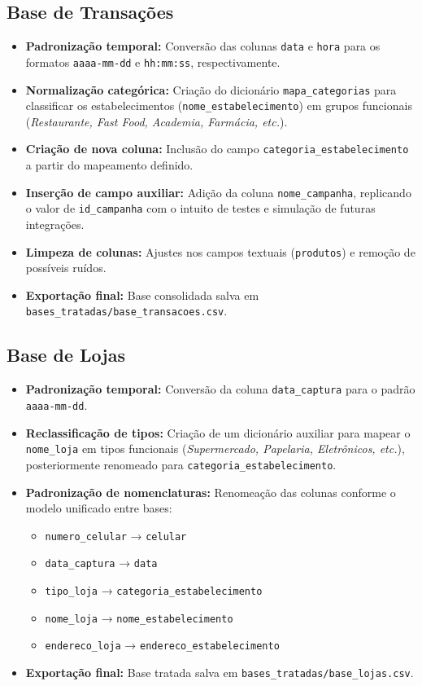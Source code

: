 \documentclass[12pt]{article}
\begin{document}
\subsection{Base de Transações}
\begin{itemize}
    \item \textbf{Padronização temporal:} Conversão das colunas \texttt{data} e \texttt{hora} para os formatos \texttt{aaaa-mm-dd} e \texttt{hh:mm:ss}, respectivamente.
    \item \textbf{Normalização categórica:} Criação do dicionário \texttt{mapa\_categorias} para classificar os estabelecimentos (\texttt{nome\_estabelecimento}) em grupos funcionais (\textit{Restaurante, Fast Food, Academia, Farmácia, etc.}).
    \item \textbf{Criação de nova coluna:} Inclusão do campo \texttt{categoria\_estabelecimento} a partir do mapeamento definido.
    \item \textbf{Inserção de campo auxiliar:} Adição da coluna \texttt{nome\_campanha}, replicando o valor de \texttt{id\_campanha} com o intuito de testes e simulação de futuras integrações.
    \item \textbf{Limpeza de colunas:} Ajustes nos campos textuais (\texttt{produtos}) e remoção de possíveis ruídos.
    \item \textbf{Exportação final:} Base consolidada salva em \texttt{bases\_tratadas/base\_transacoes.csv}.
\end{itemize}

\subsection{Base de Lojas}
\begin{itemize}
    \item \textbf{Padronização temporal:} Conversão da coluna \texttt{data\_captura} para o padrão \texttt{aaaa-mm-dd}.
    \item \textbf{Reclassificação de tipos:} Criação de um dicionário auxiliar para mapear o \texttt{nome\_loja} em tipos funcionais (\textit{Supermercado, Papelaria, Eletrônicos, etc.}), posteriormente renomeado para \texttt{categoria\_estabelecimento}.
    \item \textbf{Padronização de nomenclaturas:} Renomeação das colunas conforme o modelo unificado entre bases:
    \begin{itemize}
        \item \texttt{numero\_celular} → \texttt{celular}
        \item \texttt{data\_captura} → \texttt{data}
        \item \texttt{tipo\_loja} → \texttt{categoria\_estabelecimento}
        \item \texttt{nome\_loja} → \texttt{nome\_estabelecimento}
        \item \texttt{endereco\_loja} → \texttt{endereco\_estabelecimento}
    \end{itemize}
    \item \textbf{Exportação final:} Base tratada salva em \texttt{bases\_tratadas/base\_lojas.csv}.
\end{itemize}
\end{document}
